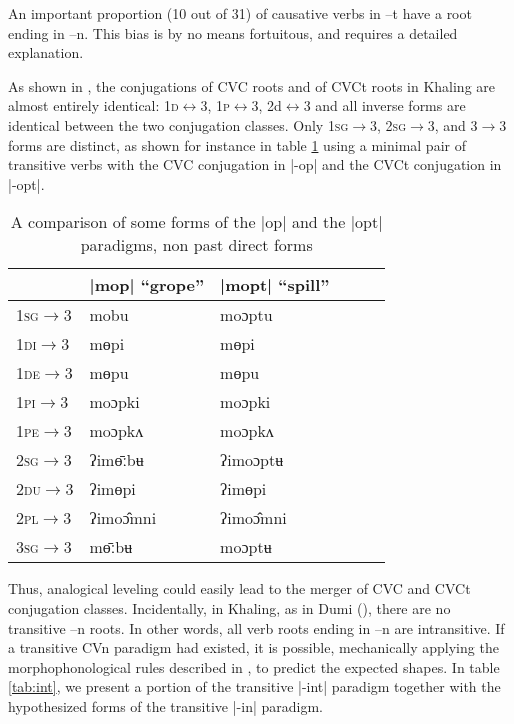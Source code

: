 \documentclass[oldfontcommands,oneside,a4paper,11pt]{article}
\newcommand{\ipa}[1]{{\phon #1}} %
\newcommand{\grise}[1]{\cellcolor{lightgray}\textbf{#1}}
\newcommand{\dhatu}[1]{|\ipa{#1}|}
\begin{document}
An important proportion (10 out of 31) of causative verbs in \ipa{--t} have a root ending in \ipa{--n}. This bias is by no means fortuitous, and requires a detailed explanation.

As shown in \citet{jacques12khaling}, the conjugations of CVC roots and of CVCt roots in Khaling are almost entirely identical: \textsc{1d}$\longleftrightarrow$3, \textsc{1p}$\longleftrightarrow$3, 2d$\longleftrightarrow$3 and all inverse forms are identical between the two conjugation classes. Only \textsc{1sg}$\rightarrow$3, \textsc{2sg}$\rightarrow$3, and 3$\rightarrow$3 forms are distinct, as shown for instance in table \ref{tab:opt} using a minimal pair of transitive verbs with  the CVC conjugation in |-op| and the CVCt conjugation in |-opt|.

\begin{table}[h]
\caption{A comparison of some forms of the \dhatu{op} and the \dhatu{opt} paradigms, non past direct forms} \label{tab:opt} \centering
\begin{tabular}{llllll}
\toprule
\textsc{} &	\dhatu{mop} ``grope''  &  	\dhatu{mopt} ``spill''  \\  	
\midrule
\textsc{1sg$\rightarrow$3} &	\ipa{mobu}&  \grise{}  	\ipa{moɔptu}  \\  	
\textsc{1di$\rightarrow$3} &	\ipa{mɵpi}  &  	\ipa{mɵpi}  \\  	
\textsc{1de$\rightarrow$3} &	\ipa{mɵpu}  &  	\ipa{mɵpu}  \\  	
\textsc{1pi$\rightarrow$3} &	\ipa{moɔpki}  &  	\ipa{moɔpki}  \\  	
\textsc{1pe$\rightarrow$3} &	\ipa{moɔpkʌ}  &  	\ipa{moɔpkʌ}  \\  	
\textsc{2sg$\rightarrow$3} &	\ipa{ʔimɵ̄ːbʉ}  &   \grise{} 	\ipa{ʔimoɔptʉ}  \\  	
\textsc{2du$\rightarrow$3} &	\ipa{ʔimɵpi}  &  	\ipa{ʔimɵpi}  \\  	
\textsc{2pl$\rightarrow$3} &	\ipa{ʔimoɔ̂mni}  &  	\ipa{ʔimoɔ̂mni}  \\  	
\textsc{3sg$\rightarrow$3} &	\ipa{mɵ̄ːbʉ}  &  \grise{}  	\ipa{moɔptʉ}  \\  	
\bottomrule
\end{tabular}
\end{table}

Thus, analogical leveling could easily lead to the merger of CVC and CVCt conjugation classes. Incidentally, in Khaling, as in Dumi (\citealt{driem93dumi}), there are no transitive \ipa{--n} roots. In other words, all verb roots ending in \ipa{--n} are intransitive.  If a transitive CVn paradigm had existed, it is possible, mechanically applying the morphophonological rules described in \citet{jacques12khaling}, to predict the expected shapes. In table \ref{tab:int}, we present a portion of the transitive |-int| paradigm together with the hypothesized forms of the transitive |-in| paradigm.
\end{document}
